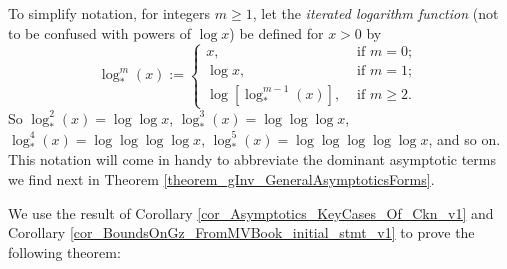 \documentclass[11pt,reqno,a4letter]{article}
\numberwithin{figure}{section}
\numberwithin{table}{section}
\theoremstyle{plain}
\numberwithin{theorem}{section}
\theoremstyle{definition}
\begin{document}
To simplify notation, for integers $m \geq 1$, let the \emph{iterated logarithm function} 
(not to be confused with powers of $\log x$) be defined for $x > 0$ by 
\[
\log_{\ast}^{m}(x) := \begin{cases} 
     x, & \text{ if $m = 0$; } \\ 
     \log x, & \text{ if $m = 1$; } \\ 
     \log\left[\log_{\ast}^{m-1}(x)\right], & \text{ if $m \geq 2$. } 
     \end{cases}
\]
So $\log_{\ast}^2(x) = \log\log x$, $\log_{\ast}^3(x) = \log\log\log x$, 
$\log_{\ast}^4(x) = \log\log\log\log x$, $\log_{\ast}^5(x) = \log\log\log\log\log x$, and so on. 
This notation will come in handy to abbreviate the dominant asymptotic terms we find next in 
Theorem \ref{theorem_gInv_GeneralAsymptoticsForms}. 

We use the result of 
Corollary \ref{cor_Asymptotics_KeyCases_Of_Ckn_v1} and 
Corollary \ref{cor_BoundsOnGz_FromMVBook_initial_stmt_v1} 
to prove the following theorem: 
\end{document}
